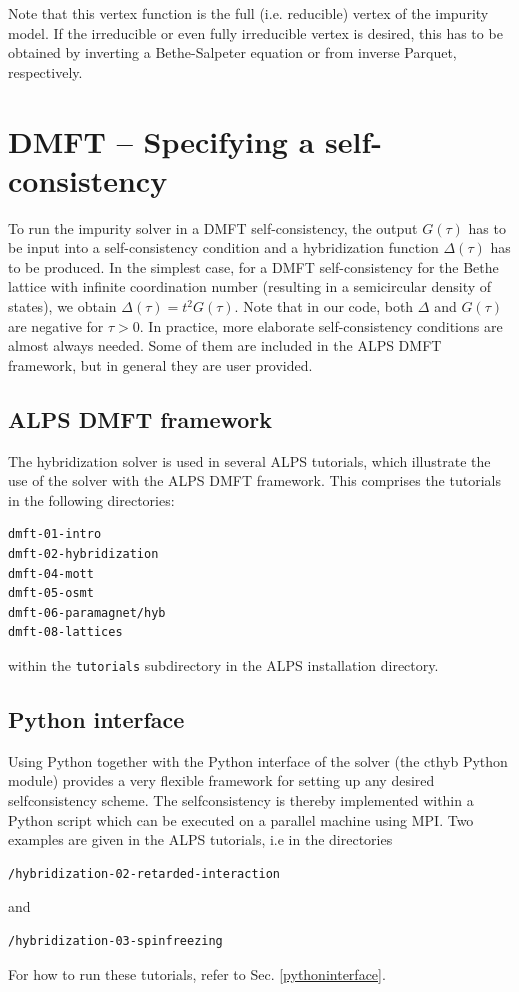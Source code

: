 \documentclass[aps,prb,floatfix,superscriptaddress,twocolumn,notitlepage]{revtex4-1}
\begin{document}
Note that this vertex function is the full (i.e. reducible) vertex of the impurity model. If the irreducible or even fully irreducible vertex is desired, this has to be obtained by inverting a Bethe-Salpeter equation or from inverse Parquet, respectively.

\section{DMFT -- Specifying a self-consistency}
To run the impurity solver in a DMFT self-consistency, the output $G(\tau)$ has to be input into a self-consistency condition and a hybridization function $\Delta(\tau)$ has to be produced.\cite{Georges96,Kotliar06} In the simplest case, for a DMFT self-consistency for the Bethe lattice with infinite coordination number (resulting in a semicircular density of states), we obtain $\Delta(\tau)=t^2G(\tau)$.
Note that in our code, both $\Delta$ and $G(\tau)$ are negative for $\tau>0$.
In practice, more elaborate self-consistency conditions are almost always needed. 
Some of them are included in the ALPS DMFT framework, but in general they are user provided.

\subsection{ALPS DMFT framework}

The hybridization solver is used in several ALPS tutorials, which illustrate the use of the solver with the ALPS DMFT framework. This comprises the tutorials in the following directories:
\begin{verbatim}
dmft-01-intro
dmft-02-hybridization
dmft-04-mott
dmft-05-osmt
dmft-06-paramagnet/hyb
dmft-08-lattices
\end{verbatim}
within the \verb#tutorials# subdirectory in the ALPS installation directory.

\subsection{Python interface}

Using Python together with the Python interface of the solver (the cthyb Python module) provides a very flexible framework for setting up any desired selfconsistency scheme.
The selfconsistency is thereby implemented within a Python script which can be executed on a parallel machine using MPI.
Two examples are given in the ALPS tutorials, i.e in the directories
\begin{verbatim}
/hybridization-02-retarded-interaction
\end{verbatim}
and
\begin{verbatim}
/hybridization-03-spinfreezing
\end{verbatim}
For how to run these tutorials, refer to Sec. \ref{pythoninterface}.
\end{document}
